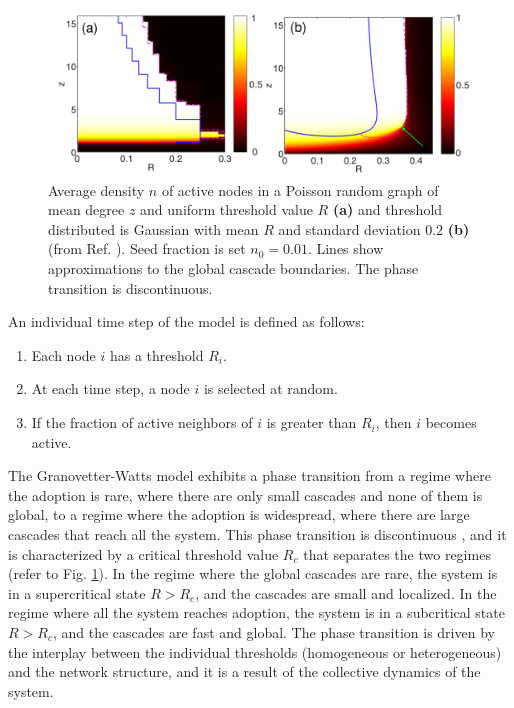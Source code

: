 \begin{figure}
    \centering
    \captionsetup{font=sf}
    \includegraphics[width=\textwidth]{Figs/cascade_gleeson.pdf}
    \caption[Cascade diagram of the Granovetter-Watts model]{Average density $n$ of active nodes in a Poisson random graph of mean degree $z$ and uniform threshold value $R$  \textbf{(a)} and threshold distributed is Gaussian with mean $R$ and standard deviation $0.2$ \textbf{(b)} (from Ref. \cite{gleeson-2007}). Seed fraction is set $n_0 = 0.01$. Lines show approximations to the global cascade boundaries. The phase transition is discontinuous.}
    \label{fig:Cascade_gleeson}
\end{figure}

\begin{theorem}
    An individual time step of the model is defined as follows:
    \begin{enumerate}
        \item Each node $i$ has a threshold $R_i$.
        \item At each time step, a node $i$ is selected at random.
        \item If the fraction of active neighbors of $i$ is greater than $R_i$, then $i$ becomes active.
    \end{enumerate}
\end{theorem}

The Granovetter-Watts model exhibits a phase transition from a regime where the adoption is rare, where there are only small cascades and none of them is global, to a regime where the adoption is widespread, where there are large cascades that reach all the system. This phase transition is discontinuous \cite{watts-2002,gleeson-2007}, and it is characterized by a critical threshold value $R_c$ that separates the two regimes (refer to Fig. \ref{fig:Cascade_gleeson}). In the regime where the global cascades are rare, the system is in a supercritical state $R > R_c$, and the cascades are small and localized. In the regime where all the system reaches adoption, the system is in a subcritical state $R > R_c$, and the cascades are fast and global. The phase transition is driven by the interplay between the individual thresholds (homogeneous or heterogeneous) and the network structure, and it is a result of the collective dynamics of the system.

